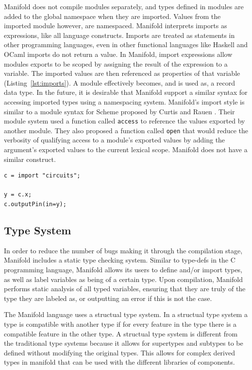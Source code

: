 Manifold does not compile modules separately, and types defined in modules are
added to the global namespace when they are imported. Values from the imported
module however, are namespaced. Manifold interprets imports as expressions,
like all language constructs. Imports are treated as statements in other
programming languages, even in other functional languages like Haskell and
OCaml imports do not return a value.  In Manifold, import expressions allow modules
exports to be scoped by assigning the result of the expression
to a variable. The imported values are then referenced as properties of that
variable (Listing~\ref{lst:imports}). A module effectively becomes, and is used as,
a
record data type. In the future, it is desirable that Manifold support a
similar syntax for accessing imported types using a namespacing system.
Manifold's import style is similar to a module syntax for Scheme proposed by
Curtis and Rauen \cite{Curtis:1990:MSS:91556.91573}. Their module system used
a function called \texttt{access} to reference the values exported by another
module. They also proposed a function called \texttt{open} that would reduce
the verbosity of qualifying access to a module's exported values by adding the
argument's exported values to the current lexical scope. Manifold does not
have a similar construct.

\begin{lstlisting}[label=lst:imports, caption=A module imported into a Manifold file]
c = import "circuits";

y = c.x;
c.outputPin(in=y);
\end{lstlisting}

\subsection{Type System}

In order to reduce the number of bugs making it through the compilation stage,
Manifold includes a static type checking system. Similar to type-defs in the C
programming language, Manifold allows its users to define and/or import types,
as well as label variables as being of a certain type. Upon compilation,
Manifold performs static analysis of all typed variables, ensuring that they are
truly of the type they are labeled as, or outputting an error if this is not the
case.

The Manifold language uses a structual type system. In a structual type system a
type is compatible with another type if for every feature in the type there is a
compatible feature in the other type. A structual type system is different from
the traditional type systems because it allows for supertypes and subtypes to be
defined without modifying the original types. This allows for complex derived
types in manifold that can be used with the different libraries of components.

